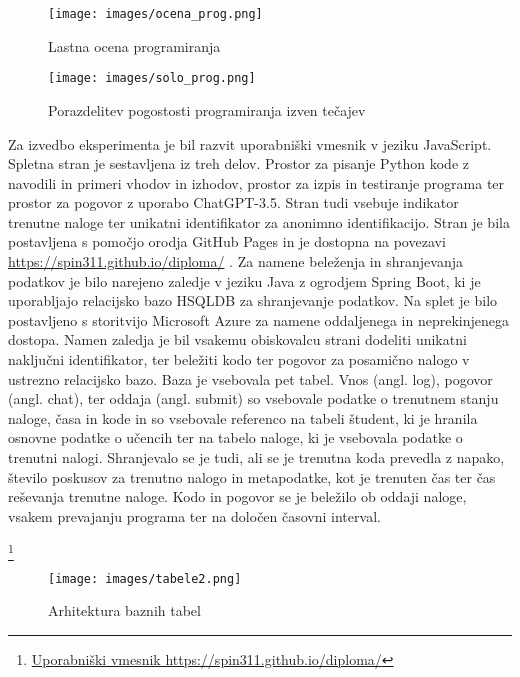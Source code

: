 \documentclass[a4paper,12pt,openright]{book}
\begin{document}
\begin{figure}[H]
    \centering
    \texttt{[image: images/ocena\_prog.png]}
    \caption{Lastna ocena programiranja}
    \label{fig:ocena_prog}
\end{figure}

\begin{figure}[H]
    \centering
    \texttt{[image: images/solo\_prog.png]}
    \caption{Porazdelitev pogostosti programiranja izven tečajev}
    \label{fig:solo_prog}
\end{figure}



Za izvedbo eksperimenta je bil razvit uporabniški vmesnik v jeziku JavaScript. Spletna stran je sestavljena iz treh delov. Prostor za pisanje Python kode z navodili in primeri vhodov in izhodov, prostor za izpis in testiranje programa ter prostor za pogovor z uporabo ChatGPT-3.5. Stran tudi vsebuje indikator trenutne naloge ter unikatni identifikator za anonimno identifikacijo. Stran je bila postavljena s pomočjo orodja GitHub Pages in je dostopna na povezavi \href{https://spin311.github.io/diploma/}{ https://spin311.github.io/diploma/} .
Za namene beleženja in shranjevanja podatkov je bilo narejeno zaledje v jeziku Java z ogrodjem Spring Boot, ki je uporabljajo relacijsko bazo HSQLDB za shranjevanje podatkov. Na splet je bilo postavljeno s storitvijo Microsoft Azure za namene oddaljenega in neprekinjenega dostopa. Namen zaledja je bil vsakemu obiskovalcu strani dodeliti unikatni naključni identifikator, ter beležiti kodo ter pogovor za posamično nalogo v ustrezno relacijsko bazo. Baza je vsebovala pet tabel. Vnos (angl. log), pogovor (angl. chat), ter oddaja (angl. submit) so vsebovale podatke o trenutnem stanju naloge, časa in kode in so vsebovale referenco na tabeli študent, ki je hranila osnovne podatke o učencih ter na tabelo naloge, ki je vsebovala podatke o trenutni nalogi. Shranjevalo se je tudi, ali se je trenutna koda prevedla z napako, število poskusov za trenutno nalogo in metapodatke, kot je trenuten čas ter čas reševanja trenutne naloge. Kodo in pogovor se je beležilo ob oddaji naloge, vsakem prevajanju programa ter na določen časovni interval.

\footnote{\href{https://spin311.github.io/diploma/}{Uporabniški vmesnik https://spin311.github.io/diploma/}}

\begin{figure}[H]
    \centering
    \texttt{[image: images/tabele2.png]}
    \caption{Arhitektura baznih tabel}
    \label{fig:enter-label}
\end{figure}
\end{document}
